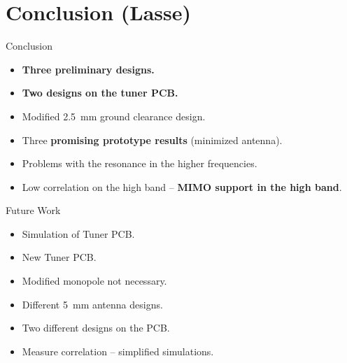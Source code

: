 \section[Conclusion]{Conclusion (Lasse)}
\begin{frame}
  \begin{block}{Conclusion}
    \begin{itemize}
    \item \textbf{Three preliminary designs.}
    \item \textbf{Two designs on the tuner PCB.}
    \item Modified \SI{2.5}{mm} ground clearance design.
    \item Three \textbf{promising prototype results} (minimized antenna).
    \item Problems with the resonance in the higher frequencies.
    \item Low correlation on the high band -- \textbf{MIMO support in the high band}.
    \end{itemize}
  \end{block}
\vspace{-3mm}
  \begin{block}{Future Work}
    \begin{itemize}
    \item Simulation of Tuner PCB.
    \item New Tuner PCB.
    \item Modified monopole not necessary. 
    \item Different \SI{5}{mm} antenna designs.
    \item Two different designs on the PCB.
    \item Measure correlation -- simplified simulations.
    \end{itemize}
  \end{block}
\end{frame}

